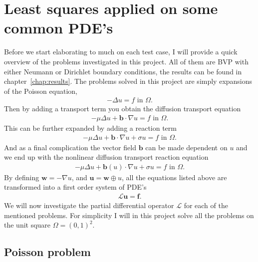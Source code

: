 \section{Least squares applied on some common PDE's}
Before we start elaborating to much on each test case, I will provide a quick overview of the problems investigated in this project. All of them are BVP with either Neumann or Dirichlet boundary conditions, the results can be found in chapter~\ref{chap:results}. The problems solved in this project are simply expansions of the Poisson equation,  
%
\begin{align}
	-\Delta u = f \text{  in  } \Omega.
	\label{eq:PoissonImplementation}
\end{align}
%
Then by adding a transport term you obtain the diffusion transport equation
%
\begin{align}
	-\mu \Delta u + \mathbf{b} \cdot \nabla u = f \text{ in } \Omega.
	\label{eq:DiffTransImplementation}
\end{align}
%
This can be further expanded by adding a reaction term
%
\begin{align}
	-\mu \Delta u + \mathbf{b} \cdot \nabla u +\sigma u = f \text{ in } \Omega.
	\label{eq:ReactionImplementation}
\end{align}
%
And as a final complication the vector field $\mathbf{b}$ can be made dependent on $u$ and we end up with the nonlinear diffusion transport reaction equation
%
\begin{align}
	-\mu \Delta u + \mathbf{b}(u) \cdot \nabla u +\sigma u = f \text{ in } \Omega.
	\label{eq:NonlinImplementation}
\end{align}
%
By defining $\mathbf{w}=-\nabla u$, and $ \mathbf{u} = \mathbf{w} \oplus u $, all the equations listed above are transformed into a first order system of PDE's 
%
\begin{align}
	\mathcal{L}\mathbf{u} = \mathbf{f}.
	\label{eq:genFirstOrderFormulation}
\end{align}
%
We will now investigate the partial differential operator $\mathcal{L}$ for each of the mentioned problems. For simplicity I will in this project solve all the problems on the unit square $ \Omega = (0,1)^2$.
%

\subsection{Poisson problem}

